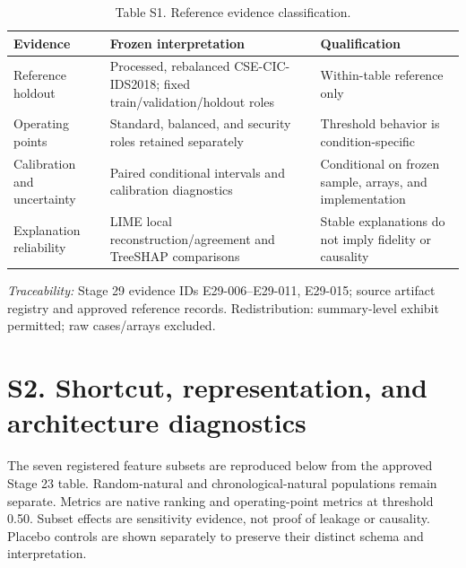 \documentclass[preprint,12pt]{elsarticle}
\begin{document}
\begin{table}[htbp]
\centering\scriptsize
\caption{Table S1. Reference evidence classification.}
\begin{tabularx}{\textwidth}{@{}lXX@{}}
\toprule
Evidence & Frozen interpretation & Qualification\\
\midrule
Reference holdout & Processed, rebalanced CSE-CIC-IDS2018; fixed train/validation/holdout roles & Within-table reference only\\
Operating points & Standard, balanced, and security roles retained separately & Threshold behavior is condition-specific\\
Calibration and uncertainty & Paired conditional intervals and calibration diagnostics & Conditional on frozen sample, arrays, and implementation\\
Explanation reliability & LIME local reconstruction/agreement and TreeSHAP comparisons & Stable explanations do not imply fidelity or causality\\
\bottomrule
\end{tabularx}
\end{table}
\textit{Traceability:} Stage 29 evidence IDs E29-006--E29-011, E29-015; source artifact registry and approved reference records. Redistribution: summary-level exhibit permitted; raw cases/arrays excluded.

\section*{S2. Shortcut, representation, and architecture diagnostics}
The seven registered feature subsets are reproduced below from the approved Stage 23 table. Random-natural and chronological-natural populations remain separate. Metrics are native ranking and operating-point metrics at threshold 0.50. Subset effects are sensitivity evidence, not proof of leakage or causality. Placebo controls are shown separately to preserve their distinct schema and interpretation.
\end{document}
